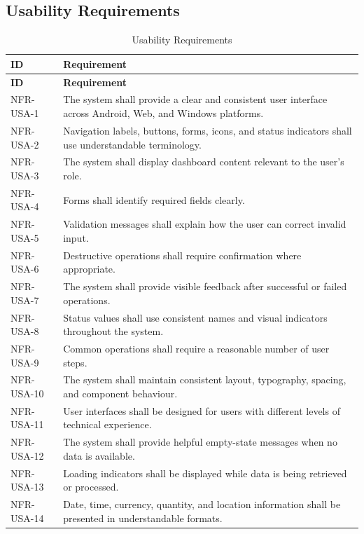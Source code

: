 \subsection{Usability Requirements}
\begin{longtable}{@{}p{2.6cm}p{10.8cm}@{}}
\caption{Usability Requirements} \label{tab:nfr-usa} \\
\toprule \textbf{ID} & \textbf{Requirement} \\ \midrule
\endfirsthead
\toprule \textbf{ID} & \textbf{Requirement} \\ \midrule
\endhead
NFR-USA-1 & The system shall provide a clear and consistent user interface across Android, Web, and Windows platforms. \\
NFR-USA-2 & Navigation labels, buttons, forms, icons, and status indicators shall use understandable terminology. \\
NFR-USA-3 & The system shall display dashboard content relevant to the user's role. \\
NFR-USA-4 & Forms shall identify required fields clearly. \\
NFR-USA-5 & Validation messages shall explain how the user can correct invalid input. \\
NFR-USA-6 & Destructive operations shall require confirmation where appropriate. \\
NFR-USA-7 & The system shall provide visible feedback after successful or failed operations. \\
NFR-USA-8 & Status values shall use consistent names and visual indicators throughout the system. \\
NFR-USA-9 & Common operations shall require a reasonable number of user steps. \\
NFR-USA-10 & The system shall maintain consistent layout, typography, spacing, and component behaviour. \\
NFR-USA-11 & User interfaces shall be designed for users with different levels of technical experience. \\
NFR-USA-12 & The system shall provide helpful empty-state messages when no data is available. \\
NFR-USA-13 & Loading indicators shall be displayed while data is being retrieved or processed. \\
NFR-USA-14 & Date, time, currency, quantity, and location information shall be presented in understandable formats. \\
\bottomrule
\end{longtable}

